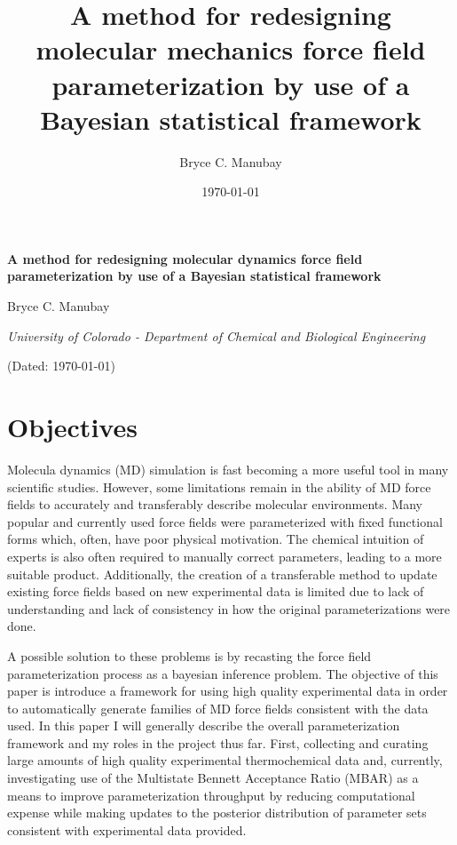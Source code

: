 \documentclass[rmp,nofootinbib,superscriptaddress,12pt,tightenlines,notitlepage]{revtex4-1}
\begin{document}

\title{A method for redesigning molecular mechanics force field parameterization by use of a Bayesian statistical framework\vspace{-2ex}}
\author{Bryce C. Manubay\vspace{-2ex}} 
\date{\today\vspace{-2ex}}

{\Large \textbf{A method for redesigning molecular dynamics force field parameterization by use of a Bayesian statistical framework}}

\hspace{0.5 in} Bryce C. Manubay

\hspace{0.5 in} \textit{University of Colorado - Department of Chemical and Biological Engineering}

\hspace{0.5 in} (Dated: \today) 


\section{Objectives}
Molecula  dynamics (MD) simulation is fast becoming a more useful tool in many scientific studies. 
However, some limitations remain in the ability of MD force fields to accurately and transferably 
describe molecular environments. Many popular and currently used force fields were parameterized 
with fixed functional forms which, often, have poor physical motivation. The chemical intuition of 
experts is also often required to manually correct parameters, leading to a more suitable product. 
Additionally, the creation of a transferable method to update existing force fields based on new 
experimental data is limited due to lack of understanding and lack of consistency in how the original 
parameterizations were done.

A possible solution to these problems is by recasting the force field parameterization process as a 
bayesian inference problem. The objective of this paper is introduce a framework for using high quality 
experimental data in order to automatically generate families of MD force fields consistent with the data 
used. In this paper I will generally describe the overall parameterization framework and my roles in the project 
thus far. First, collecting and curating large amounts of high quality experimental thermochemical data 
and, currently, investigating use of the Multistate Bennett Acceptance Ratio (MBAR) as a means to improve 
parameterization throughput by reducing computational expense while making updates to the posterior distribution 
of parameter sets consistent with experimental data provided.
\end{document}
